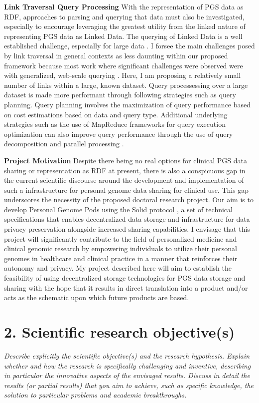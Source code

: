 \documentclass[a4paper,11pt]{article}
\begin{document}
\textbf{Link Traversal Query Processing}
With the representation of PGS data as RDF, approaches to parsing and querying that data must also be investigated, especially to encourage leveraging the greatest utility from the linked nature of representing PGS data as Linked Data.
The querying of Linked Data is a well established challenge, especially for large data \cite{taelman_evaluation_2023}.
I forsee the main challenges posed by link traversal in general contexts as less daunting within our proposed framework because most work where significant challenges were observed were with generalized, web-scale querying \cite{taelman_evaluation_2023}. 
Here, I am proposing a relatively small number of links within a large, known dataset. 
Query processessing over a large dataset is made more performant through following strategies such as query planning.
Query planning involves the maximization of query performance based on cost estimations based on data and query type. 
Additional underlying strategies such as the use of MapReduce frameworks for query execution optimization can also improve query performance through the use of query decomposition and parallel processing \cite{shim_mapreduce_2013}.  



\textbf{Project Motivation}
Despite there being no real options for clinical PGS data sharing or representation as RDF at present, there is also a conspicuous gap in the current scientific discourse around the development and implementation of such a infrastructure for personal genome data sharing for clinical use. 
This gap underscores the necessity of the proposed doctoral research project.
Our aim is to develop Personal Genome Pods using the Solid protocol \cite{capadisli_solid_nodate}, a set of technical specifications that enables decentralized data storage and infrastructure for data privacy preservation alongside increased sharing capabilities.  
I envisage that this project will significantly contribute to the field of personalized medicine and clinical genomic research by empowering individuals to utilize their personal genomes in healthcare and clinical practice in a manner that reinforces their autonomy and privacy. 
My project described here will aim to establish the feasibility of using decentralized storage technologies for PGS data storage and sharing with the hope that it results in direct translation into a product and/or acts as the schematic upon which future products are based. 


\section{2. Scientific research objective(s)}
\textit{Describe explicitly the scientific objective(s) and the research hypothesis. Explain whether and how the research is specifically challenging and inventive, describing in particular the innovative aspects of the envisaged results. Discuss in detail the results (or partial results) that you aim to achieve, such as specific knowledge, the solution to particular problems and academic breakthroughs.}
\end{document}
